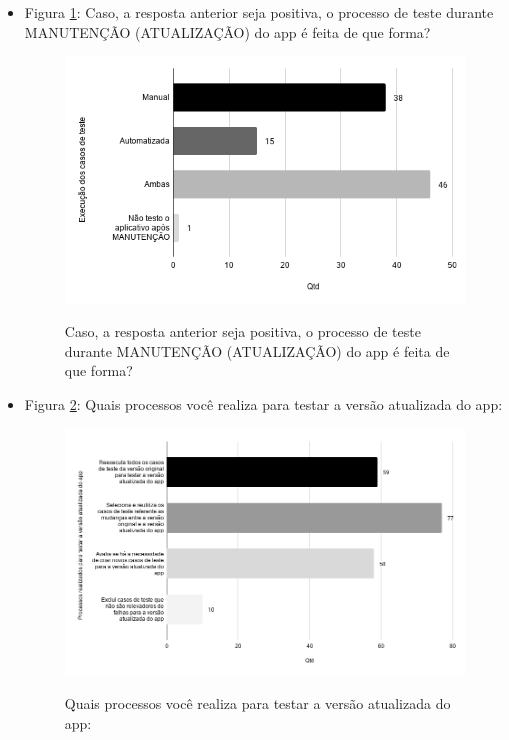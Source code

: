 \begin{itemize}
    
    \item Figura \ref{figure:s_formatestemanutencao}: Caso, a resposta anterior seja positiva, o processo de teste durante MANUTENÇÃO (ATUALIZAÇÃO) do app é feita de que forma?
    \begin{figure}[!htb]
    \centering
    \includegraphics[width=.55\textwidth]{images/s_formatestemanutencao.png}
    \label{figure:s_formatestemanutencao}
    \caption{Caso, a resposta anterior seja positiva, o processo de teste durante MANUTENÇÃO (ATUALIZAÇÃO) do app é feita de que forma?}
    \end{figure}     
    
    
    \item Figura \ref{figure:s_processostestemanutencao}: Quais processos você realiza para testar a versão atualizada do app:
    \begin{figure}[!htb]
    \centering
    \includegraphics[width=.55\textwidth]{images/s_processostestemanutencao.png}
    \label{figure:s_processostestemanutencao}
    \caption{Quais processos você realiza para testar a versão atualizada do app:}
    \end{figure}    
    
    
    
    
    
    
    
    
    
    
    
    
    
    
    
    
    
\end{itemize}
















